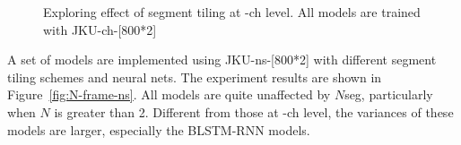 \begin{figure}[htb]
	\caption{Exploring effect of segment tiling at -ch level. All models are trained with JKU-ch-[800*2]}
	\label{fig:N-frame}
\end{figure}

A set of models are implemented using JKU-ns-[800*2] with different segment tiling schemes and neural nets. The experiment results are shown in Figure~\ref{fig:N-frame-ns}. All models are quite unaffected by $N$seg, particularly when $N$ is greater than 2. Different from those at -ch level, the variances of these models are larger, especially the BLSTM-RNN models.

